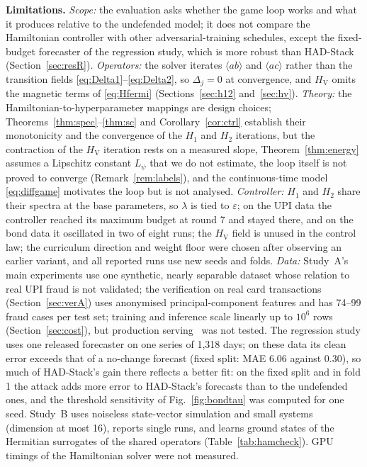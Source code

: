 \documentclass[conference]{IEEEtran}
\newcommand{\HV}{H_{\mathrm{V}}}
\begin{document}
\textbf{Limitations.}
\emph{Scope:} the evaluation asks whether the game loop works and what it produces relative to the undefended model; it does not compare the Hamiltonian controller with other adversarial-training schedules, except the fixed-budget forecaster of the regression study, which is more robust than HAD-Stack (Section~\ref{sec:resR}). \emph{Operators:} the solver iterates $\langle ab\rangle$ and $\langle ac\rangle$ rather than the transition fields \eqref{eq:Delta1}--\eqref{eq:Delta2}, so $\Delta_j=0$ at convergence, and $\HV$ omits the magnetic terms of \eqref{eq:Hfermi} (Sections~\ref{sec:h12} and~\ref{sec:hv}). \emph{Theory:} the Hamiltonian-to-hyperparameter mappings are design choices; Theorems~\ref{thm:spec}--\ref{thm:sc} and Corollary~\ref{cor:ctrl} establish their monotonicity and the convergence of the $H_1$ and $H_2$ iterations, but the contraction of the $\HV$ iteration rests on a measured slope, Theorem~\ref{thm:energy} assumes a Lipschitz constant $L_\psi$ that we do not estimate, the loop itself is not proved to converge (Remark~\ref{rem:labels}), and the continuous-time model \eqref{eq:diffgame} motivates the loop but is not analysed. \emph{Controller:} $H_1$ and $H_2$ share their spectra at the base parameters, so $\lambda$ is tied to $\varepsilon$; on the UPI data the controller reached its maximum budget at round 7 and stayed there, and on the bond data it oscillated in two of eight runs; the $\HV$ field is unused in the control law; the curriculum direction and weight floor were chosen after observing an earlier variant, and all reported runs use new seeds and folds. \emph{Data:} Study~A's main experiments use one synthetic, nearly separable dataset whose relation to real UPI fraud is not validated; the verification on real card transactions (Section~\ref{sec:verA}) uses anonymised principal-component features and has 74--99 fraud cases per test set; training and inference scale linearly up to $10^6$ rows (Section~\ref{sec:cost}), but production serving~\cite{amodei2016} was not tested. The regression study uses one released forecaster on one series of 1,318 days; on these data its clean error exceeds that of a no-change forecast (fixed split: MAE 6.06 against 0.30), so much of HAD-Stack's gain there reflects a better fit: on the fixed split and in fold 1 the attack adds more error to HAD-Stack's forecasts than to the undefended ones, and the threshold sensitivity of Fig.~\ref{fig:bondtau} was computed for one seed. Study~B uses noiseless state-vector simulation and small systems (dimension at most 16), reports single runs, and learns ground states of the Hermitian surrogates of the shared operators (Table~\ref{tab:hamcheck}). GPU timings of the Hamiltonian solver were not measured.
\end{document}
